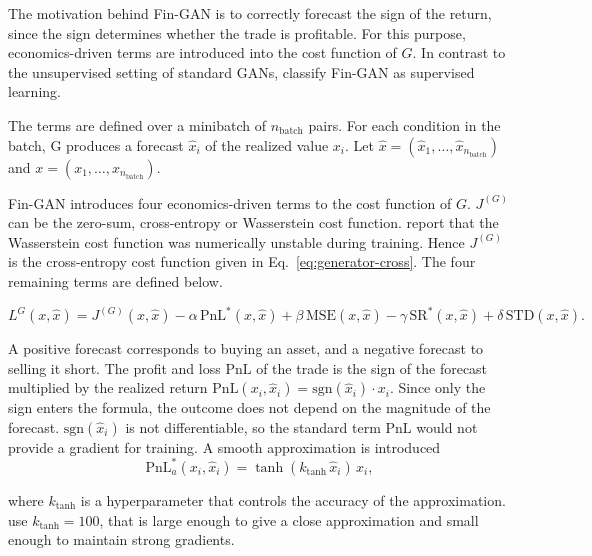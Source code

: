 The motivation behind Fin-GAN is to correctly forecast the sign of the return, since the sign determines whether the trade is profitable. For this purpose, economics-driven terms are introduced into the cost function of $G$. In contrast to the unsupervised setting of standard GANs, \textcite{vuleticFinGANForecastingClassifying2024} classify Fin-GAN as supervised learning.

The terms are defined over a minibatch of $n_{\text{batch}}$ pairs. For each condition in the batch, G produces a forecast $\hat{x}_i$ of the realized value $x_i$. Let $\hat{x}=(\hat{x}_1, \ldots, \hat{x}_{n_{\text{batch}}})$ and $x=(x_1, \ldots, x_{n_{\text{batch}}})$. 

Fin-GAN introduces four economics-driven terms to the cost function of $G$. 
$J^{(G)}$ can be the zero-sum, cross-entropy or Wasserstein cost function. \textcite{vuleticFinGANForecastingClassifying2024} report that the Wasserstein cost function was numerically unstable during training. Hence
$J^{(G)}$ is the cross-entropy cost function given in Eq.~\ref{eq:generator-cross}.  The four remaining terms are defined below.

\begin{equation}
L^{G}(x, \hat{x}) = J^{(G)}(x, \hat{x})
- \alpha\,\mathrm{PnL}^{*}(x, \hat{x})
+ \beta\,\mathrm{MSE}(x, \hat{x})
- \gamma\,\mathrm{SR}^{*}(x, \hat{x})
+ \delta\,\mathrm{STD}(x, \hat{x}).
\label{eq:fingan-loss}
\end{equation}

A positive forecast corresponds to buying an asset, and a negative forecast to selling it short. The profit and loss $\mathrm{PnL}$ of the trade is the sign of the forecast multiplied by the realized return $\mathrm{PnL}(x_i, \hat{x}_i)=\mathrm{sgn}(\hat{x}_i)\cdot x_i$. Since only the sign enters the formula, the outcome does not depend on the magnitude of the forecast. $\mathrm{sgn}(\hat{x}_i)$ is not differentiable, so the standard term $\mathrm{PnL}$ would not provide a gradient for training. A smooth approximation is introduced
\begin{equation}
\mathrm{PnL}^{*}_{a}(x_i, \hat{x}_i) = \tanh(k_{\tanh}\,\hat{x}_i)\,x_i,
\end{equation}

where $k_{\tanh}$ is a hyperparameter that controls the accuracy of the approximation. \textcite{vuleticFinGANForecastingClassifying2024} use $k_{\tanh}=100$, that is large enough to give a close approximation and small enough to maintain strong gradients. 

